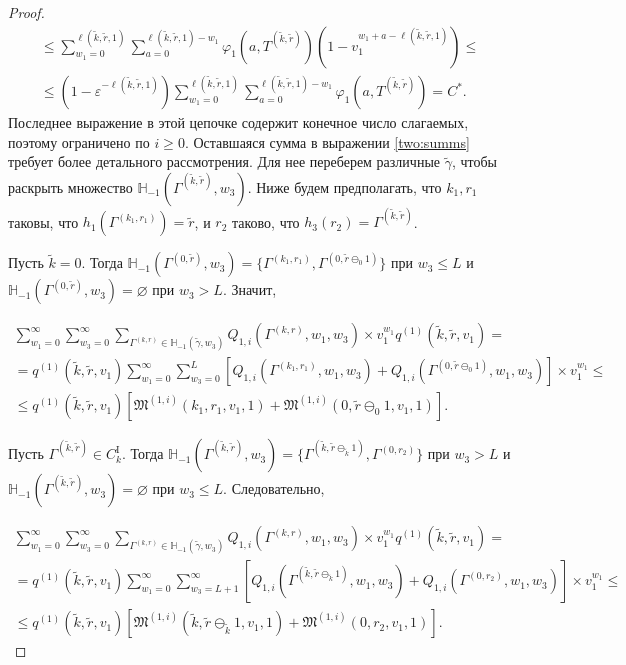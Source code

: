 \documentclass[a4paper,twoside]{article}
\theoremstyle{theorem}
\theoremstyle{remark}
\begin{document}
\begin{proof}
\begin{multline}
\leqslant
\sum_{w_1=0}^{\ell(\tilde{k},\tilde{r},1)} \sum_{a=0}^{\ell(\tilde{k},\tilde{r},1)-w_1} \varphi_1(a,T^{(\tilde{k},\tilde{r})})(1-v_1^{w_1+a-\ell(\tilde{k},\tilde{r},1)})\leqslant \\
\leqslant
(1-\varepsilon^{-\ell(\tilde{k},\tilde{r},1)}) \sum_{w_1=0}^{\ell(\tilde{k},\tilde{r},1)} \sum_{a=0}^{\ell(\tilde{k},\tilde{r},1)-w_1} \varphi_1(a,T^{(\tilde{k},\tilde{r})}) = C^*.
\label{define:constant}
\end{multline}
Последнее выражение в этой цепочке содержит конечное число слагаемых, поэтому ограничено по $i\geqslant 0$.
Оставшаяся сумма в выражении \eqref{two:summs} требует более детального рассмотрения. Для нее переберем различные $\tilde{\gamma}$, чтобы раскрыть множество ${\mathbb H}_{-1}(\Gamma^{(\tilde{k},\tilde{r})}, w_3) $. Ниже будем предполагать, что $k_1, r_1$ таковы, что $h_1(\Gamma^{(k_1,r_1)})=\tilde{r}$, и $r_2$ таково, что $h_3(r_2)=\Gamma^{(\tilde{k},\tilde{r})}$.

Пусть $\tilde{k} = 0$. Тогда ${\mathbb H}_{-1}(\Gamma^{(0,\tilde{r})}, w_3) = \{\Gamma^{(k_1,r_1)}, \Gamma^{(0,\tilde{r}\ominus_0 1)}\}$ при $w_3\leqslant L$ и ${\mathbb H}_{-1}(\Gamma^{(0,\tilde{r})}, w_3) = \varnothing$ при $w_3 > L$.  Значит,


\begin{multline*}
 \sum_{w_1=0}^{\infty}\sum_{w_3=0}^{\infty} \sum_{\Gamma^{(k,r)} \in {\mathbb H}_{-1}(\tilde{\gamma},w_3)} Q_{1,i}(\Gamma^{(k,r)},w_1,w_3)  \times  v_1^{w_1} q^{(1)}(\tilde{k},\tilde{r},v_1) = \\ = q^{(1)}(\tilde{k},\tilde{r},v_1)  \sum_{w_1=0}^{\infty}\sum_{w_3=0}^{L} [ Q_{1,i}(\Gamma^{(k_1,r_1)},w_1,w_3) + Q_{1,i}(\Gamma^{(0,\tilde{r}\ominus_0 1)},w_1,w_3) ] \times  v_1^{w_1} \leqslant \\ \leqslant
 q^{(1)}(\tilde{k},\tilde{r},v_1)  [\mathfrak{M}^{(1,i)}(k_1,r_1,v_1,1)  + \mathfrak{M}^{(1,i)}(0,\tilde{r}\ominus_0 1,v_1,1) ].
\end{multline*}


Пусть $\Gamma^{(\tilde{k},\tilde{r})}\in C_k^{\mathrm{I}}$. Тогда ${\mathbb H}_{-1}(\Gamma^{(\tilde{k},\tilde{r})}, w_3) = \{\Gamma^{(\tilde{k},\tilde{r}\ominus_{\tilde{k}} 1)}, \Gamma^{(0,r_2)}\}$ при $w_3 >  L$ и ${\mathbb H}_{-1}(\Gamma^{(\tilde{k},\tilde{r})}, w_3) = \varnothing$ при $w_3 \leqslant L$. Следовательно,

\begin{multline*}
 \sum_{w_1=0}^{\infty}\sum_{w_3=0}^{\infty} \sum_{\Gamma^{(k,r)} \in {\mathbb H}_{-1}(\tilde{\gamma},w_3)} Q_{1,i}(\Gamma^{(k,r)},w_1,w_3)  \times  v_1^{w_1} q^{(1)}(\tilde{k},\tilde{r},v_1) = \\ = q^{(1)}(\tilde{k},\tilde{r},v_1)  \sum_{w_1=0}^{\infty}\sum_{w_3=L+1}^{\infty} [ Q_{1,i}(\Gamma^{(\tilde{k},\tilde{r}\ominus_{\tilde{k}} 1)},w_1,w_3) + Q_{1,i}(\Gamma^{(0,r_2)},w_1,w_3) ] \times  v_1^{w_1} \leqslant \\ \leqslant
 q^{(1)}(\tilde{k},\tilde{r},v_1)  [\mathfrak{M}^{(1,i)}(\tilde{k},\tilde{r}\ominus_{\tilde{k}} 1,v_1,1)  + \mathfrak{M}^{(1,i)}(0,r_2,v_1,1) ].
\end{multline*}



\end{proof}
\end{document}
